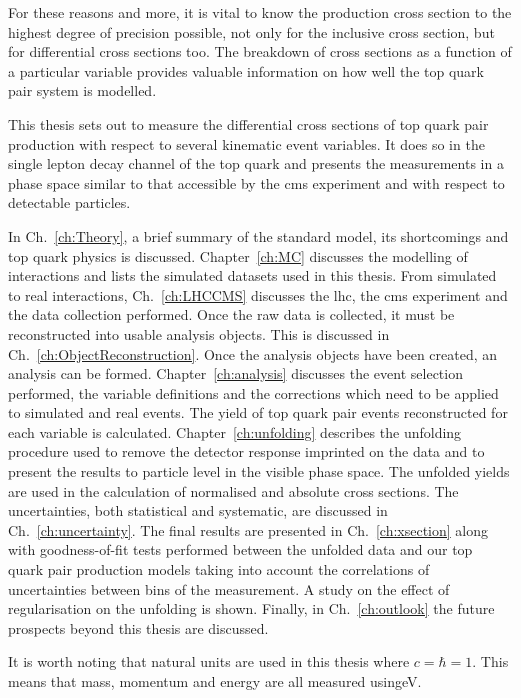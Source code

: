 For these reasons and more, it is vital to know the production cross section to the highest degree of precision possible, not only for the inclusive cross section, but for differential cross sections too.
The breakdown of cross sections as a function of a particular variable provides valuable information on how well the top quark pair system is modelled.

This thesis sets out to measure the differential cross sections of top quark pair production with respect to several kinematic event variables.
It does so in the single lepton decay channel of the top quark and presents the measurements in a phase space similar to that accessible by the \acrfull{cms} experiment and with respect to detectable particles.

In Ch.~\ref{ch:Theory}, a brief summary of the standard model, its shortcomings and top quark physics is discussed. 
Chapter~\ref{ch:MC} discusses the modelling of interactions and lists the simulated datasets used in this thesis.
From simulated to real interactions, Ch.~\ref{ch:LHCCMS} discusses the \acrfull{lhc}, the \acrshort{cms} experiment and the data collection performed.
Once the raw data is collected, it must be reconstructed into usable analysis objects.
This is discussed in Ch.~\ref{ch:ObjectReconstruction}.
Once the analysis objects have been created, an analysis can be formed. 
Chapter~\ref{ch:analysis} discusses the event selection performed, the variable definitions and the corrections which need to be applied to simulated and real events.
The yield of top quark pair events reconstructed for each variable is calculated.
Chapter~\ref{ch:unfolding} describes the unfolding procedure used to remove the detector response imprinted on the data and to present the results to particle level in the visible phase space.
The unfolded yields are used in the calculation of normalised and absolute cross sections.
The uncertainties, both statistical and systematic, are discussed in Ch.~\ref{ch:uncertainty}.
The final results are presented in Ch.~\ref{ch:xsection} along with goodness-of-fit tests performed between the unfolded data and our top quark pair production models taking into account the correlations of uncertainties between bins of the measurement.
A study on the effect of regularisation on the unfolding is shown.
Finally, in Ch.~\ref{ch:outlook} the future prospects beyond this thesis are discussed.

It is worth noting that natural units are used in this thesis where $c = \hbar = 1$. This means that mass, momentum and energy are all measured using\unit{eV}.









